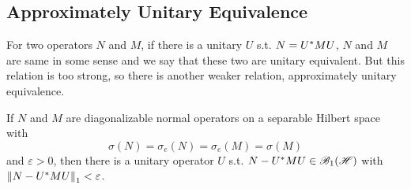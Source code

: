 \subsection{Approximately Unitary Equivalence}

For two operators $N$ and $M$, if there is a unitary $U$ s.t. $N = U^{*}MU$, $N$ and $M$ are same in some sense and we say that these two are unitary equivalent. But this relation is too strong, so there is another weaker relation, approximately unitary equivalence.

\begin{lem}
	If $N$ and $M$ are diagonalizable normal operators on a separable Hilbert space with
	\begin{equation*}
		\sigma(N) = \sigma_e(N) = \sigma_e(M) = \sigma(M)
	\end{equation*}
	and $\varepsilon > 0$, then there is a unitary operator $U$ s.t. $N-U^{*}MU \in \mathscr{B}_{1}\mathscr{(H)}$ with $\left\lVert N-U^{*}MU\right\lVert_1 < \varepsilon$. 
\end{lem}
